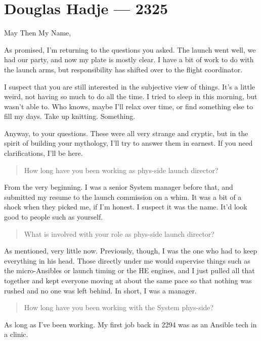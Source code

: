 \hypertarget{douglas-hadje-2325}{%
\chapter{Douglas Hadje — 2325}\label{douglas-hadje-2325}}

May Then My Name,

As promised, I'm returning to the questions you asked. The launch went well, we had our party, and now my plate is mostly clear. I have a bit of work to do with the launch arms, but responsibility has shifted over to the flight coordinator.

I suspect that you are still interested in the subjective view of things. It's a little weird, not having so much to do all the time. I tried to sleep in this morning, but wasn't able to. Who knows, maybe I'll relax over time, or find something else to fill my days. Take up knitting. Something.

Anyway, to your questions. These were all very strange and cryptic, but in the spirit of building your mythology, I'll try to answer them in earnest. If you need clarifications, I'll be here.

\begin{quote}
How long have you been working as phys-side launch director?
\end{quote}

\noindent From the very beginning. I was a senior System manager before that, and submitted my resume to the launch commission on a whim. It was a bit of a shock when they picked me, if I'm honest. I suspect it was the name. It'd look good to people such as yourself.

\begin{quote}
What is involved with your role as phys-side launch director?
\end{quote}

\noindent As mentioned, very little now. Previously, though, I was the one who had to keep everything in his head. Those directly under me would supervise things such as the micro-Ansibles or launch timing or the HE engines, and I just pulled all that together and kept everyone moving at about the same pace so that nothing was rushed and no one was left behind. In short, I was a manager.

\begin{quote}
How long have you been working with the System phys-side?
\end{quote}

\noindent As long as I've been working. My first job back in 2294 was as an Ansible tech in a clinic.

